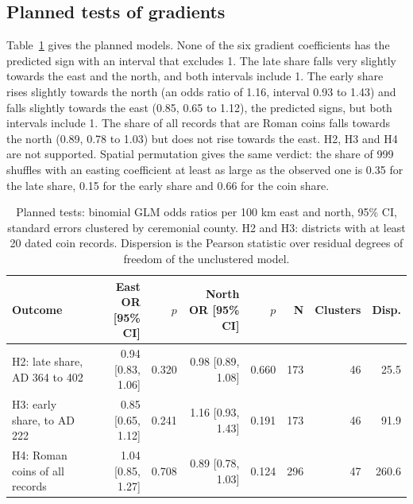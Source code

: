 \documentclass[11pt,a4paper]{article}
\begin{document}
\subsection{Planned tests of gradients}
Table~\ref{tab:main} gives the planned models. None of the six gradient coefficients has the predicted sign with an interval that excludes 1. The late share falls very slightly towards the east and the north, and both intervals include 1. The early share rises slightly towards the north (an odds ratio of 1.16, interval 0.93 to 1.43) and falls slightly towards the east (0.85, 0.65 to 1.12), the predicted signs, but both intervals include 1. The share of all records that are Roman coins falls towards the north (0.89, 0.78 to 1.03) but does not rise towards the east. H2, H3 and H4 are not supported. Spatial permutation gives the same verdict: the share of 999 shuffles with an easting coefficient at least as large as the observed one is 0.35 for the late share, 0.15 for the early share and 0.66 for the coin share.

\begin{table}[tbp]\centering\footnotesize\caption{Planned tests: binomial GLM odds ratios per 100 km east and north, 95\% CI, standard errors clustered by ceremonial county. H2 and H3: districts with at least 20 dated coin records. Dispersion is the Pearson statistic over residual degrees of freedom of the unclustered model.}\label{tab:main}\begin{tabular}{lrrrrrrr}\toprule Outcome & East OR [95\% CI] & $p$ & North OR [95\% CI] & $p$ & N & Clusters & Disp.\\\midrule
H2: late share, AD 364 to 402 & 0.94 [0.83, 1.06] & 0.320 & 0.98 [0.89, 1.08] & 0.660 & 173 & 46 & 25.5\\
H3: early share, to AD 222 & 0.85 [0.65, 1.12] & 0.241 & 1.16 [0.93, 1.43] & 0.191 & 173 & 46 & 91.9\\
H4: Roman coins of all records & 1.04 [0.85, 1.27] & 0.708 & 0.89 [0.78, 1.03] & 0.124 & 296 & 47 & 260.6\\
\bottomrule\end{tabular}\end{table}
\end{document}
